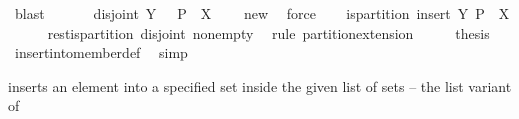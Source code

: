 \begin{isabellebody}
\ blast\isanewline
\ \ \isamarkupfalse%
\ {\isacharasterisk}\ \isamarkupfalse%
\ disjoint{\isacharcolon}\ {\isachardoublequoteopen}{\isacharquery}Y\ {\isasyminter}\ {\isasymUnion}\ {\isacharparenleft}P\ {\isacharminus}\ {\isacharbraceleft}X{\isacharbraceright}{\isacharparenright}\ {\isacharequal}\ {\isacharbraceleft}{\isacharbraceright}{\isachardoublequoteclose}\ \isamarkupfalse%
\ new\ \isamarkupfalse%
\ force\isanewline
\ \ \isamarkupfalse%
\ {\isachardoublequoteopen}is{\isacharunderscore}partition\ {\isacharparenleft}insert\ {\isacharquery}Y\ {\isacharparenleft}P\ {\isacharminus}\ {\isacharbraceleft}X{\isacharbraceright}{\isacharparenright}{\isacharparenright}{\isachardoublequoteclose}\isanewline
\ \ \ \ \isamarkupfalse%
\ rest{\isacharunderscore}is{\isacharunderscore}partition\ disjoint\ non{\isacharunderscore}empty\ \isamarkupfalse%
\ {\isacharparenleft}rule\ partition{\isacharunderscore}extension{}{\isacharparenright}\isanewline
\ \ \isamarkupfalse%
\ \isamarkupfalse%
\ {\isacharquery}thesis\ \isamarkupfalse%
\ insert{\isacharunderscore}into{\isacharunderscore}member{\isacharunderscore}def\ \isamarkupfalse%
\ simp\isanewline
{}\isamarkupfalse%
%
\endisatagproof
{\isafoldproof}%
%
\isadelimproof
%
\endisadelimproof
%
\begin{isamarkuptext}%
inserts an element into a specified set inside the given list of sets --
   the list variant of 


\end{isamarkuptext}
\end{isabellebody}
